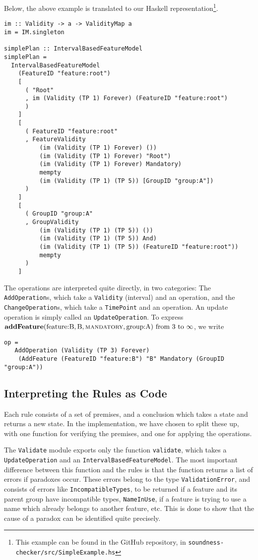Below, the above example is translated to our Haskell representation\footnote{This example can be found in the GitHub repository, in \texttt{soundness-checker/\allowbreak src/\allowbreak SimpleExample.hs}}.

\begin{verbatim}
im :: Validity -> a -> ValidityMap a
im = IM.singleton

simplePlan :: IntervalBasedFeatureModel
simplePlan =
  IntervalBasedFeatureModel
    (FeatureID "feature:root")
    [
      ( "Root"
      , im (Validity (TP 1) Forever) (FeatureID "feature:root")
      )
    ]
    [
      ( FeatureID "feature:root"
      , FeatureValidity
          (im (Validity (TP 1) Forever) ())
          (im (Validity (TP 1) Forever) "Root")
          (im (Validity (TP 1) Forever) Mandatory)
          mempty
          (im (Validity (TP 1) (TP 5)) [GroupID "group:A"])
      )
    ]
    [
      ( GroupID "group:A"
      , GroupValidity
          (im (Validity (TP 1) (TP 5)) ())
          (im (Validity (TP 1) (TP 5)) And)
          (im (Validity (TP 1) (TP 5)) (FeatureID "feature:root"))
          mempty
      )
    ]

\end{verbatim}

The operations are interpreted quite directly, in two categories: The \texttt{Add\-Operation}s, which take a \texttt{Validity} (interval) and an operation, and the \texttt{Change\-Operation}s, which take a \texttt{TimePoint} and an operation. An update operation is simply called an \texttt{Update\-Operation}. To express $\textbf{addFeature}(\text{feature:B}, \text{B}, \textsc{mandatory}{}, \text{group:A}) \text{ from } 3 \text{ to } \infty$, we write
\begin{verbatim}
op =
   AddOperation (Validity (TP 3) Forever)
    (AddFeature (FeatureID "feature:B") "B" Mandatory (GroupID "group:A"))
\end{verbatim}


\subsection{Interpreting the Rules as Code}
Each rule consists of a set of premises, and a conclusion which takes a state and returns a new state. In the implementation, we have chosen to split these up, with one function for verifying the premises, and one for applying the operations.

The \texttt{Validate} module exports only the function \texttt{validate}, which takes a \texttt{Update\-Operation} and an \texttt{Interval\-Based\-Feature\-Model}. The most important difference between this function and the rules is that the function returns a list of errors if paradoxes occur. These errors belong to the type \texttt{Validation\-Error}, and consists of errors like \texttt{Incompatible\-Types}, to be returned if a feature and its parent group have incompatible types, \texttt{Name\-In\-Use}, if a feature is trying to use a name which already belongs to another feature, etc. This is done to show that the cause of a paradox can be identified quite precisely.

